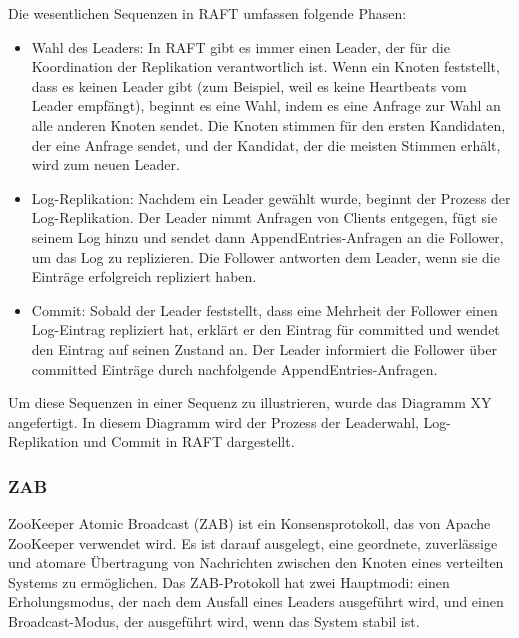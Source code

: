 Die wesentlichen Sequenzen in RAFT umfassen folgende Phasen:
\begin{itemize}
\item Wahl des Leaders: In RAFT gibt es immer einen Leader, der für die Koordination der Replikation verantwortlich ist. Wenn ein Knoten feststellt, dass es keinen Leader gibt (zum Beispiel, weil es keine Heartbeats vom Leader empfängt), beginnt es eine Wahl, indem es eine Anfrage zur Wahl an alle anderen Knoten sendet. Die Knoten stimmen für den ersten Kandidaten, der eine Anfrage sendet, und der Kandidat, der die meisten Stimmen erhält, wird zum neuen Leader.
\item Log-Replikation: Nachdem ein Leader gewählt wurde, beginnt der Prozess der Log-Replikation. Der Leader nimmt Anfragen von Clients entgegen, fügt sie seinem Log hinzu und sendet dann AppendEntries-Anfragen an die Follower, um das Log zu replizieren. Die Follower antworten dem Leader, wenn sie die Einträge erfolgreich repliziert haben.
\item Commit: Sobald der Leader feststellt, dass eine Mehrheit der Follower einen Log-Eintrag repliziert hat, erklärt er den Eintrag für committed und wendet den Eintrag auf seinen Zustand an. Der Leader informiert die Follower über committed Einträge durch nachfolgende AppendEntries-Anfragen.
\end{itemize}
Um diese Sequenzen in einer Sequenz zu illustrieren, wurde  das Diagramm XY angefertigt. In diesem Diagramm wird der Prozess der Leaderwahl, Log-Replikation und Commit in RAFT dargestellt.


\subsubsection{ZAB}
ZooKeeper Atomic Broadcast (ZAB) ist ein Konsensprotokoll, das von Apache ZooKeeper verwendet wird. Es ist darauf ausgelegt, eine geordnete, zuverlässige und atomare Übertragung von Nachrichten zwischen den Knoten eines verteilten Systems zu ermöglichen. Das ZAB-Protokoll hat zwei Hauptmodi: einen Erholungsmodus, der nach dem Ausfall eines Leaders ausgeführt wird, und einen Broadcast-Modus, der ausgeführt wird, wenn das System stabil ist.

